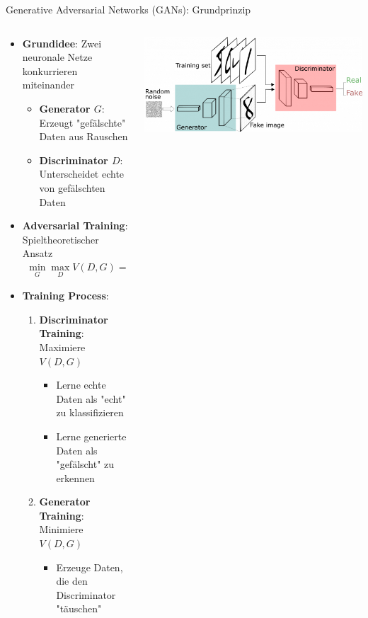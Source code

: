 \documentclass[aspectratio=1610, xcolor=dvipsnames, 9pt]{beamer}
\begin{document}
\begin{frame}{Generative Adversarial Networks (GANs): Grundprinzip}
  \begin{columns}
    \begin{column}{0.7\textwidth}
      \begin{itemize}
        \item \textbf{Grundidee}: Zwei neuronale Netze konkurrieren miteinander
        \begin{itemize}
          \item \textbf{Generator $G$}: Erzeugt "gefälschte" Daten aus Rauschen
          \item \textbf{Discriminator $D$}: Unterscheidet echte von gefälschten Daten
        \end{itemize}
        \item \textbf{Adversarial Training}: Spieltheoretischer Ansatz
        \begin{align}
          \min_G \max_D V(D,G) = \mathbb{E}_{x \sim p_{data}(x)}[\log D(x)] + \mathbb{E}_{z \sim p_z(z)}[\log(1-D(G(z)))]
        \end{align}
        \item \textbf{Training Process}:
        \begin{enumerate}
          \item \textbf{Discriminator Training}: Maximiere $V(D,G)$
          \begin{itemize}
            \item Lerne echte Daten als "echt" zu klassifizieren
            \item Lerne generierte Daten als "gefälscht" zu erkennen
          \end{itemize}
          \item \textbf{Generator Training}: Minimiere $V(D,G)$
          \begin{itemize}
            \item Erzeuge Daten, die den Discriminator "täuschen"
          \end{itemize}
        \end{enumerate}
      \end{itemize}
    \end{column}
    \begin{column}{0.3\textwidth}
      \centering
      \includegraphics[width=\textwidth]{images/GAN.png}
    \end{column}
  \end{columns}
\end{frame}
\end{document}
